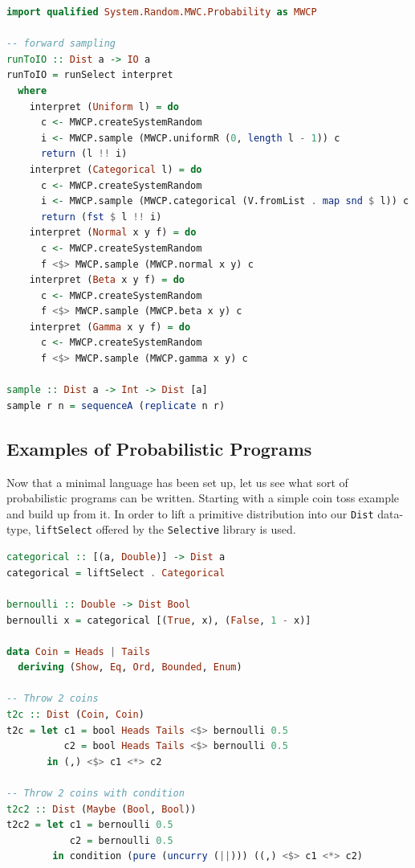 \documentclass[
  oneside,
  11pt, a4paper,
  footinclude=true,
  headinclude=true,
  cleardoublepage=empty
]{scrbook}
\theoremstyle{definition}
\theoremstyle{definition}
\begin{document}
    \begin{lstlisting}[language=Haskell, caption={Sampling function},captionpos=b]
import qualified System.Random.MWC.Probability as MWCP
 
-- forward sampling
runToIO :: Dist a -> IO a
runToIO = runSelect interpret
  where
    interpret (Uniform l) = do
      c <- MWCP.createSystemRandom
      i <- MWCP.sample (MWCP.uniformR (0, length l - 1)) c
      return (l !! i)
    interpret (Categorical l) = do
      c <- MWCP.createSystemRandom
      i <- MWCP.sample (MWCP.categorical (V.fromList . map snd $ l)) c
      return (fst $ l !! i)
    interpret (Normal x y f) = do
      c <- MWCP.createSystemRandom
      f <$> MWCP.sample (MWCP.normal x y) c
    interpret (Beta x y f) = do
      c <- MWCP.createSystemRandom
      f <$> MWCP.sample (MWCP.beta x y) c
    interpret (Gamma x y f) = do
      c <- MWCP.createSystemRandom
      f <$> MWCP.sample (MWCP.gamma x y) c

sample :: Dist a -> Int -> Dist [a]
sample r n = sequenceA (replicate n r)
    \end{lstlisting}
    
    \subsection{Examples of Probabilistic Programs}
    
    Now that a minimal language has been set up, let us see what sort of probabilistic programs can be written. Starting with a simple coin toss example and build up from it. In order to lift a primitive distribution into our \texttt{Dist} data-type, \texttt{liftSelect} offered by the \texttt{Selective} library is used.
    
    \begin{lstlisting}[language=Haskell, caption={Coin toss},captionpos=b]
categorical :: [(a, Double)] -> Dist a
categorical = liftSelect . Categorical

bernoulli :: Double -> Dist Bool
bernoulli x = categorical [(True, x), (False, 1 - x)]

data Coin = Heads | Tails
  deriving (Show, Eq, Ord, Bounded, Enum)
  
-- Throw 2 coins
t2c :: Dist (Coin, Coin)
t2c = let c1 = bool Heads Tails <$> bernoulli 0.5
          c2 = bool Heads Tails <$> bernoulli 0.5
       in (,) <$> c1 <*> c2

-- Throw 2 coins with condition
t2c2 :: Dist (Maybe (Bool, Bool))
t2c2 = let c1 = bernoulli 0.5
           c2 = bernoulli 0.5
        in condition (pure (uncurry (||))) ((,) <$> c1 <*> c2)
    \end{lstlisting}
    
\end{document}
